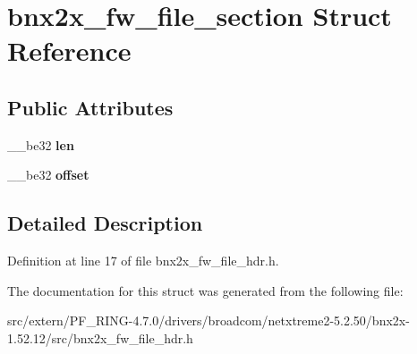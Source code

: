 \hypertarget{structbnx2x__fw__file__section}{
\section{bnx2x\_\-fw\_\-file\_\-section Struct Reference}
\label{structbnx2x__fw__file__section}
}
\subsection*{Public Attributes}
\begin{DoxyCompactItemize}
\item 
\hypertarget{structbnx2x__fw__file__section_ad308e70e38a728491cd7b38f4e17b21f}{
\_\-\_\-be32 {\bfseries len}}
\label{structbnx2x__fw__file__section_ad308e70e38a728491cd7b38f4e17b21f}

\item 
\hypertarget{structbnx2x__fw__file__section_ac7fe63ea2e19efc40a19aa5371dd49db}{
\_\-\_\-be32 {\bfseries offset}}
\label{structbnx2x__fw__file__section_ac7fe63ea2e19efc40a19aa5371dd49db}

\end{DoxyCompactItemize}


\subsection{Detailed Description}


Definition at line 17 of file bnx2x\_\-fw\_\-file\_\-hdr.h.



The documentation for this struct was generated from the following file:\begin{DoxyCompactItemize}
\item 
src/extern/PF\_\-RING-\/4.7.0/drivers/broadcom/netxtreme2-\/5.2.50/bnx2x-\/1.52.12/src/bnx2x\_\-fw\_\-file\_\-hdr.h\end{DoxyCompactItemize}
